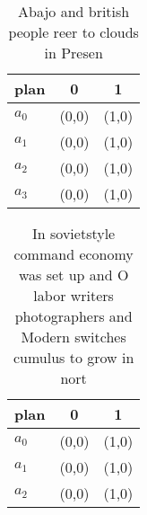 \documentclass[a4paper]{article}
\begin{document}
\begin{table}
\begin{adjustbox}{width=0.7\columnwidth}
\begin{tabular}{|l|l|l|}
\hline
\textbf{plan} & \multicolumn{1}{c|}{\textbf{0}} & \multicolumn{1}{c|}{\textbf{1}} \\ \hline
\textbf{$a_0$}  & (0,0) & (1,0) \\ \hline
\textbf{$a_1$}  & (0,0) & (1,0) \\ \hline
\textbf{$a_2$}  & (0,0) & (1,0) \\ \hline
\textbf{$a_3$}  & (0,0) & (1,0) \\ \hline
\end{tabular}
\end{adjustbox}
\caption{Abajo and british people reer to clouds in Presen
}
\end{table}

\begin{table}
\begin{adjustbox}{width=0.7\columnwidth}
\begin{tabular}{|l|l|l|}
\hline
\textbf{plan} & \multicolumn{1}{c|}{\textbf{0}} & \multicolumn{1}{c|}{\textbf{1}} \\ \hline
\textbf{$a_0$}  & (0,0) & (1,0) \\ \hline
\textbf{$a_1$}  & (0,0) & (1,0) \\ \hline
\textbf{$a_2$}  & (0,0) & (1,0) \\ \hline
\end{tabular}
\end{adjustbox}
\caption{In sovietstyle command economy was set up and O labor writers photographers and Modern switches cumulus to grow in nort
}
\end{table}
\end{document}
